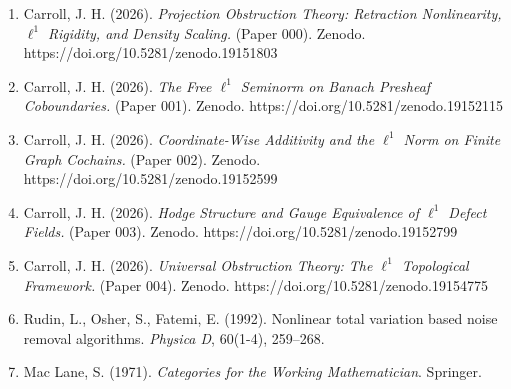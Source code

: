 \documentclass[
]{article}
\providecommand{\tightlist}{%
  \setlength{\itemsep}{0pt}\setlength{\parskip}{0pt}}
\begin{document}
\begin{enumerate}
\def\labelenumi{\arabic{enumi}.}
\tightlist
\item
  Carroll, J. H. (2026). \emph{Projection Obstruction Theory: Retraction
  Nonlinearity, \(\ell^1\) Rigidity, and Density Scaling.} (Paper 000).
  Zenodo. https://doi.org/10.5281/zenodo.19151803
\item
  Carroll, J. H. (2026). \emph{The Free \(\ell^1\) Seminorm on Banach
  Presheaf Coboundaries.} (Paper 001). Zenodo.
  https://doi.org/10.5281/zenodo.19152115
\item
  Carroll, J. H. (2026). \emph{Coordinate-Wise Additivity and the
  \(\ell^1\) Norm on Finite Graph Cochains.} (Paper 002). Zenodo.
  https://doi.org/10.5281/zenodo.19152599
\item
  Carroll, J. H. (2026). \emph{Hodge Structure and Gauge Equivalence of
  \(\ell^1\) Defect Fields.} (Paper 003). Zenodo.
  https://doi.org/10.5281/zenodo.19152799
\item
  Carroll, J. H. (2026). \emph{Universal Obstruction Theory: The
  \(\ell^1\) Topological Framework.} (Paper 004). Zenodo.
  https://doi.org/10.5281/zenodo.19154775
\item
  Rudin, L., Osher, S., Fatemi, E. (1992). Nonlinear total variation
  based noise removal algorithms. \emph{Physica D}, 60(1-4), 259--268.
\item
  Mac Lane, S. (1971). \emph{Categories for the Working Mathematician}.
  Springer.
\end{enumerate}
\end{document}
